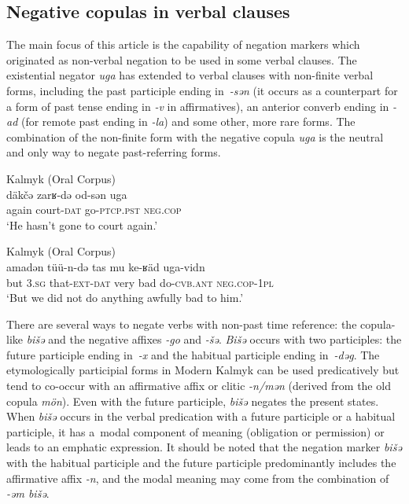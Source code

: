 \documentclass[output=paper]{langsci/langscibook}
\begin{document}
\subsection{Negative copulas in verbal clauses}\label{sec:BK3.3}

The main focus of this article is the capability of negation markers which originated as non-verbal negation to be used in some verbal clauses. The existential negator \textit{uga} has extended to verbal clauses with non-finite verbal forms, including the past participle ending in \textit{-sǝn} (it occurs as a counterpart for a form of past tense ending in \textit{-v} in affirmatives), an anterior converb ending in \textit{-ad} (for remote past ending in \textit{-la}) and some other, more rare forms. The combination of the non-finite form with the negative copula \textit{uga} is the neutral and only way to negate past-referring forms.

\ea Kalmyk (Oral Corpus) \label{ex:BK44}\\
	\gll däkčǝ	zarʁ-dǝ		od-sǝn		uga\\
	again	court-\textsc{dat}	go-\textsc{ptcp.pst}	\textsc{neg.cop}\\
	\glt `He hasn’t gone to court again.'
\z

\ea Kalmyk (Oral Corpus) \label{ex:BK45}\\
	\gll a\footnotemark	madǝn	tüü-n-dǝ			tas		mu	ke-ʁäd	uga-vidn\\
	but	\textsc{3.sg}		that-\textsc{ext-dat}	very	bad	do-\textsc{cvb.ant}	\textsc{neg.cop-1pl}\\
	\glt `But we did not do anything awfully bad to him.'
\z


There are several ways to negate verbs with non-past time reference: the copula-like \textit{bišǝ} and the negative affixes \textit{-go} and \textit{-šǝ}. \textit{Bišǝ} occurs with two participles: the future participle ending in \textit{-x} and the habitual participle ending in \textit{-dəg}. The etymologically participial forms in Modern Kalmyk can be used predicatively but tend to co-occur with an affirmative affix or clitic \textit{-n/mən} (derived from the old copula \textit{mön}). Even with the future participle, \textit{bišǝ} negates the present states. When \textit{bišǝ} occurs in the verbal predication with a future participle or a habitual participle, it has a modal component of meaning (obligation or permission) or leads to an emphatic expression. It should be noted that the negation marker \textit{bišǝ} with the habitual participle and the future participle predominantly includes the affirmative affix \textit{-n}, and the modal meaning may come from the combination of \textit{-ǝm bišǝ}.
\end{document}
